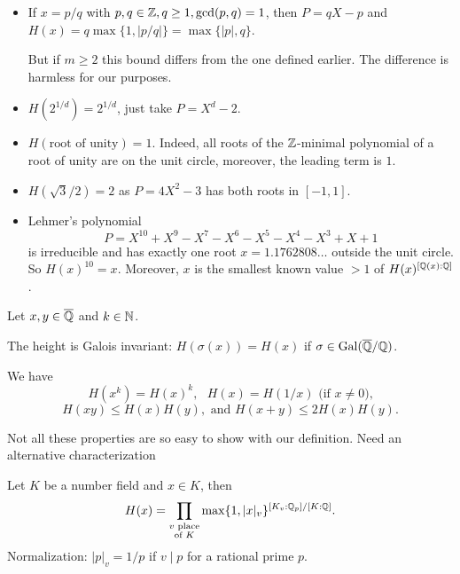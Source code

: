 \documentclass{beamer}
\begin{document}
\begin{frame}
  \begin{itemize}
  \item If $x=p/q$ with $p,q\in{\mathbb{Z}},q\ge 1,\gcd(p,q)=1$, then
    $P=qX-p$ and
    $H(x) = q\max\{1,|p/q|\} = \max\{|p|,q\}.$

    But if $m\ge 2$ this bound \alert{differs}  from the one defined
    earlier. The difference is harmless for our purposes.

  \item $H(2^{1/d}) = 2^{1/d}$, just take $P=X^d-2$.

  \item $H(\text{root of unity}) = 1$. Indeed, all roots of the
    ${\mathbb{Z}}$-minimal polynomial of a root of unity are on the unit
    circle, moreover, the leading term is $1$.

  \item $H(\sqrt{3}/2) = 2$ as $P = 4X^2-3$ has both roots in
    $[-1,1]$.
  \item Lehmer's polynomial
    $$P=X^{10}+X^9-X^7-X^6-X^5-X^4-X^3+X+1$$
    is
    irreducible and has exactly one root $x=1.1762808\ldots$ outside the
    unit circle. So $H(x)^{10} = x$. Moreover, $x$ is the \alert{smallest known}
    value $>1$ of $H(x)^{[{\mathbb{Q}}(x):{\mathbb{Q}}]}$. 
    
  \end{itemize}
\end{frame}


\begin{frame}
  Let $x,y\in{\overline{\mathbb{Q}}}$ and $k\in{\mathbb{N}}$. 
  
  The height is Galois invariant:
  $H(\sigma(x))=H(x)$ if $\sigma\in\mathrm{Gal}({\overline{\mathbb{Q}}}/{\mathbb{Q}})$.
  
  We have $$H(x^k) = H(x)^k,\text{ }H(x)=H(1/x)
  \text{  (if $x\not=0$),}$$
  $$ H(xy)\le H(x)H(y), \text{ and }H(x+y)\le 2H(x)H(y).$$

  Not all these properties are so easy to show with our definition.
  Need an alternative characterization

  \begin{lemma}
    Let $K$ be a number field and $x\in K$, then
    $$H(x) = \prod_{\substack{v\text{ place} \\\text{of $K$}}}
    \max\{1,|x|_v\}^{[K_v:{\mathbb{Q}}_p]/[K:{\mathbb{Q}}]}.$$
    Normalization: $|p|_v=1/p$ if $v\mid p$ for a rational prime $p$.
  \end{lemma}
  
\end{frame}
\end{document}
